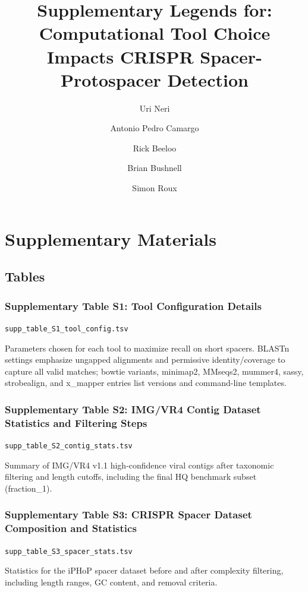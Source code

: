 \documentclass[
]{article}
\title{Supplementary Legends for: Computational Tool Choice Impacts
CRISPR Spacer-Protospacer Detection}
\author{Uri Neri \and Antonio Pedro Camargo \and Rick Beeloo \and Brian
Bushnell \and Simon Roux}
\date{}
\begin{document}
\maketitle


\section{Supplementary Materials}\label{supplementary-materials}

\subsection{Tables}\label{tables}

\subsubsection{Supplementary Table S1: Tool Configuration
Details}\label{tbl-supp-tool-config}

\texttt{supp\_table\_S1\_tool\_config.tsv}

Parameters chosen for each tool to maximize recall on short spacers.
BLASTn settings emphasize ungapped alignments and permissive
identity/coverage to capture all valid matches; bowtie variants,
minimap2, MMseqs2, mummer4, sassy, strobealign, and x\_mapper entries
list versions and command-line templates.

\subsubsection{Supplementary Table S2: IMG/VR4 Contig Dataset Statistics
and Filtering Steps}\label{tbl-supp-contig-stats}

\texttt{supp\_table\_S2\_contig\_stats.tsv}

Summary of IMG/VR4 v1.1 high-confidence viral contigs after taxonomic
filtering and length cutoffs, including the final HQ benchmark subset
(fraction\_1).

\subsubsection{Supplementary Table S3: CRISPR Spacer Dataset Composition
and Statistics}\label{tbl-supp-spacer-stats}

\texttt{supp\_table\_S3\_spacer\_stats.tsv}

Statistics for the iPHoP spacer dataset before and after complexity
filtering, including length ranges, GC content, and removal criteria.
\end{document}
